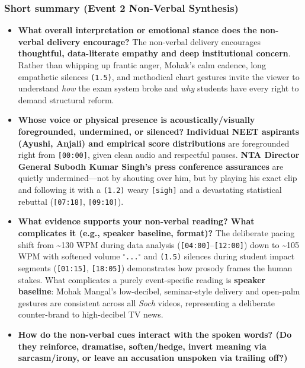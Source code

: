 \documentclass[10pt,a4paper]{article}
\begin{document}
\subsubsection*{Short summary (Event 2 Non-Verbal Synthesis)}

\begin{itemize}
  \item \textbf{What overall interpretation or emotional stance does the non-verbal delivery encourage?}
The non-verbal delivery encourages \textbf{thoughtful, data-literate empathy and deep institutional concern}. Rather than whipping up frantic anger, Mohak's calm cadence, long empathetic silences \texttt{(1.5)}, and methodical chart gestures invite the viewer to understand \textit{how} the exam system broke and \textit{why} students have every right to demand structural reform.\par\smallskip
  \item \textbf{Whose voice or physical presence is acoustically/visually foregrounded, undermined, or silenced?}
\textbf{Individual NEET aspirants (Ayushi, Anjali) and empirical score distributions} are foregrounded right from \texttt{[00:00]}, given clean audio and respectful pauses. \textbf{NTA Director General Subodh Kumar Singh's press conference assurances} are quietly undermined---not by shouting over him, but by playing his exact clip and following it with a \texttt{(1.2)} weary \texttt{[sigh]} and a devastating statistical rebuttal (\texttt{[07:18]}, \texttt{[09:10]}).\par\smallskip
  \item \textbf{What evidence supports your non-verbal reading? What complicates it (e.g., speaker baseline, format)?}
The deliberate pacing shift from \textasciitilde{}130 WPM during data analysis (\texttt{[04:00]}--\texttt{[12:00]}) down to \textasciitilde{}105 WPM with softened volume \texttt{$^\circ$...$^\circ$} and \texttt{(1.5)} silences during student impact segments (\texttt{[01:15]}, \texttt{[18:05]}) demonstrates how prosody frames the human stakes. What complicates a purely event-specific reading is \textbf{speaker baseline}: Mohak Mangal's low-decibel, seminar-style delivery and open-palm gestures are consistent across all \textit{Soch} videos, representing a deliberate counter-brand to high-decibel TV news.\par\smallskip
  \item \textbf{How do the non-verbal cues interact with the spoken words? (Do they reinforce, dramatise, soften/hedge, invert meaning via sarcasm/irony, or leave an accusation unspoken via trailing off?)}

\end{itemize}
\end{document}
